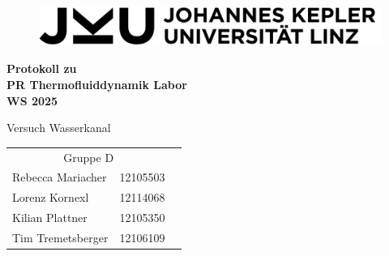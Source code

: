 \begin{titlepage} 
\begin{titlepage} 
    \begin{center}

        \begin{figure}[h]     
            \centering
            \includegraphics[width=14cm]{Fotos/JKU_Logo_2.jpg}
        \end{figure}
        
        \vspace{3cm}
        
        \Large
        \textbf{Protokoll zu\\}
        \Huge
        \textbf{PR Thermofluiddynamik Labor \\ WS 2025\\}

        \vspace{2cm}
        \Huge
        Versuch Wasserkanal\\
        \vspace{5cm}
        
        \begin{table}[h]
        \large
        \centering
        \begin{tabular}{lll}
        \multicolumn{2}{c}{Gruppe D}\\
        Rebecca Mariacher & 12105503 \\
        Lorenz Kornexl &  12114068 \\
        Kilian Plattner & 12105350 \\
        Tim Tremetsberger & 12106109\\
        \end{tabular}
        \end{table}

        \vspace{1.5cm}


     
    \end{center}


\end{titlepage}
\end{titlepage}